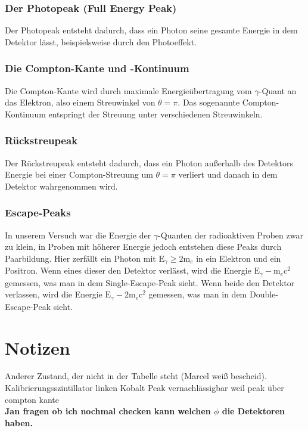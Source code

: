 \documentclass[12pt,a4paper,titlepage]{article}
\begin{document}
\subsubsection{Der Photopeak (Full Energy Peak)}

Der Photopeak entsteht dadurch, dass ein Photon seine gesamte Energie in dem Detektor lässt, beispielsweise durch den Photoeffekt.

\subsubsection{Die Compton-Kante und -Kontinuum}

Die Compton-Kante wird durch maximale Energieübertragung vom $\gamma$-Quant an das Elektron, also einem Streuwinkel von $\theta = \pi$. Das sogenannte Compton-Kontinuum entspringt der Streuung unter verschiedenen Streuwinkeln.

\subsubsection{Rückstreupeak}

Der Rückstreupeak entsteht dadurch, dass ein Photon außerhalb des Detektors Energie bei einer Compton-Streuung um $\theta = \pi$ verliert und danach in dem Detektor wahrgenommen wird. 

\subsubsection{Escape-Peaks}

In unserem Versuch war die Energie der $\gamma$-Quanten der radioaktiven Proben zwar zu klein, in Proben mit höherer Energie jedoch entstehen diese Peaks durch Paarbildung. Hier zerfällt ein Photon mit $\text{E}_\gamma \ge 2 \text{m}_e$ in ein Elektron und ein Positron. Wenn eines dieser den Detektor verlässt, wird die Energie $\text{E}_\gamma - \text{m}_e \text{c}^2$ gemessen, was man in dem Single-Escape-Peak sieht. Wenn beide den Detektor verlassen, wird die Energie $\text{E}_\gamma - 2 \text{m}_e \text{c}^2$ gemessen, was man in dem Double-Escape-Peak sieht. 



\section{Notizen}
Anderer Zustand, der nicht in der Tabelle steht (Marcel weiß bescheid). \\
Kalibrierungsszintillator linken Kobalt Peak vernachlässigbar weil peak über compton kante\\
\textbf{Jan fragen ob ich nochmal checken kann welchen $\phi$ die Detektoren haben.}
\end{document}
